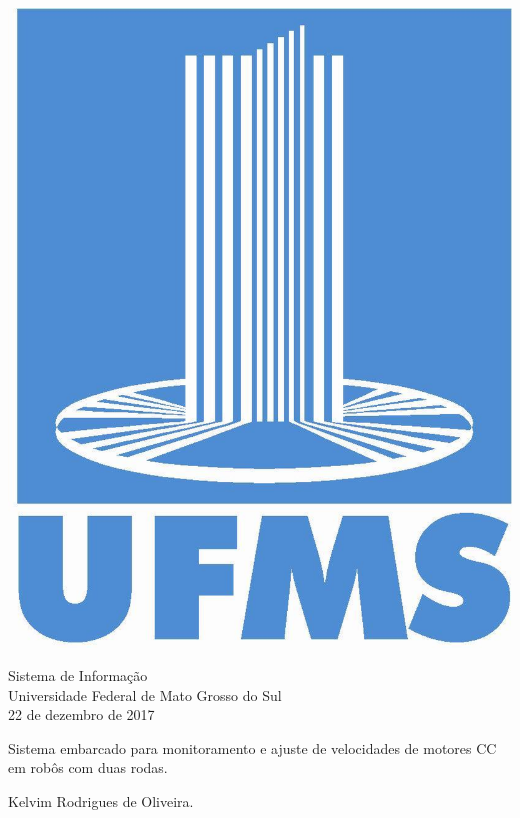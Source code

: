 \documentclass[a4paper,12pt,portuguese]{ufms-cpcx}
\begin{document}
\thispagestyle{empty}

\vskip 0.5cm


\vfill \centerline{\includegraphics[scale=0.15]{figuras/ufms-logo.jpg}}

\vskip 0.5cm
\begin{center}
	Sistema de Informação\\
	Universidade Federal de Mato Grosso do Sul\\
	22 de dezembro de 2017
\end{center}

\cleardoublepage
\thispagestyle{empty}
\begin{center}
	{\Large Sistema embarcado para monitoramento e ajuste de velocidades de motores {CC} em robôs com duas rodas.}
	
	\vspace{2cm}
	
	{\large\sc Kelvim Rodrigues de Oliveira.}
	
	\vspace{3cm}	
\end{center}
\end{document}
